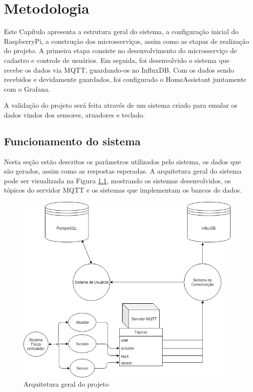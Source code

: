 \chapter{Metodologia}

Este Capítulo apresenta a estrutura geral do sistema, a configuração inicial do RaspberryPi, a construção dos microsserviços, assim como as etapas de realização do projeto. A
primeira etapa consiste no desenvolvimento do microsserviço de cadastro e controle de usuários. Em seguida, foi desenvolvido o sistema que recebe os dados via MQTT, guardando-os no InfluxDB. Com os dados sendo recebidos e devidamente guardados, foi configurado o HomeAssistant juntamente com o Grafana.

A validação do projeto será feita através de um sistema criado para emular os dados vindos dos sensores, atuadores e teclado. %

\section{Funcionamento do sistema} \label{sec:funcionamento}

Nesta seção estão descritos os parâmetros utilizados pelo sistema, os dados que são gerados, assim como as respostas esperadas. A arquitetura geral do sistema pode ser visualizada na Figura \ref{fig:arqgeral}, mostrando os sistemas desenvolvidos, os tópicos do servidor MQTT e os sistemas que implementam os bancos de dados.

\begin{figure}[htbp]
	\centering
	\includegraphics[width=0.7\linewidth]{figuras/arquiteturaprojeto.png}
	\caption{Arquitetura geral do projeto}
	\label{fig:arqgeral}
\end{figure}

